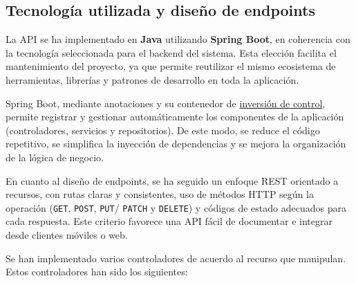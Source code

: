 \subsection{Tecnología utilizada y diseño de endpoints}

La API se ha implementado en \textbf{Java} utilizando \textbf{Spring Boot}, en coherencia con la tecnología seleccionada para el backend del sistema. Esta elección facilita el mantenimiento del proyecto,
ya que permite reutilizar el mismo ecosistema de herramientas, librerías y patrones de desarrollo en toda la aplicación.

Spring Boot, mediante anotaciones y su contenedor de \hyperlink{inversionControl}{inversión de control}, permite registrar y gestionar automáticamente los componentes de la aplicación (controladores, servicios y repositorios).
De este modo, se reduce el código repetitivo, se simplifica la inyección de dependencias y se mejora la organización de la lógica de negocio.

En cuanto al diseño de endpoints, se ha seguido un enfoque REST orientado a recursos, con rutas claras y consistentes, uso de métodos HTTP según la operación (\texttt{GET}, \texttt{POST}, \texttt{PUT}/
\texttt{PATCH} y \texttt{DELETE}) y códigos de estado adecuados para cada respuesta. Este criterio favorece una API fácil de documentar e integrar desde clientes móviles o web.

Se han implementado varios controladores de acuerdo al recurso que manipulan. Estos controladores han sido los siguientes:

